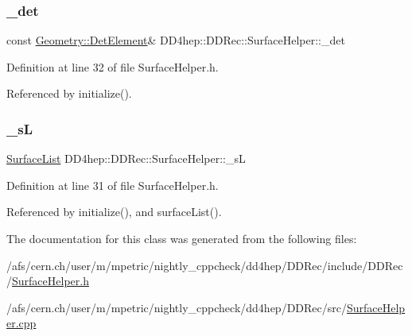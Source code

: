 \subsubsection{\texorpdfstring{\+\_\+det}{\_det}}
{\footnotesize\ttfamily const \hyperlink{class_d_d4hep_1_1_geometry_1_1_det_element}{Geometry\+::\+Det\+Element}\& D\+D4hep\+::\+D\+D\+Rec\+::\+Surface\+Helper\+::\+\_\+det\hspace{0.3cm}{\ttfamily [protected]}}



Definition at line 32 of file Surface\+Helper.\+h.



Referenced by initialize().

\hypertarget{class_d_d4hep_1_1_d_d_rec_1_1_surface_helper_a9284825af9dcbb9557f0cde59090dcd6}{}\label{class_d_d4hep_1_1_d_d_rec_1_1_surface_helper_a9284825af9dcbb9557f0cde59090dcd6} 
\subsubsection{\texorpdfstring{\+\_\+sL}{\_sL}}
{\footnotesize\ttfamily \hyperlink{class_d_d4hep_1_1_d_d_rec_1_1_surface_list}{Surface\+List} D\+D4hep\+::\+D\+D\+Rec\+::\+Surface\+Helper\+::\+\_\+sL\hspace{0.3cm}{\ttfamily [protected]}}



Definition at line 31 of file Surface\+Helper.\+h.



Referenced by initialize(), and surface\+List().



The documentation for this class was generated from the following files\+:\begin{DoxyCompactItemize}
\item 
/afs/cern.\+ch/user/m/mpetric/nightly\+\_\+cppcheck/dd4hep/\+D\+D\+Rec/include/\+D\+D\+Rec/\hyperlink{_surface_helper_8h}{Surface\+Helper.\+h}\item 
/afs/cern.\+ch/user/m/mpetric/nightly\+\_\+cppcheck/dd4hep/\+D\+D\+Rec/src/\hyperlink{_surface_helper_8cpp}{Surface\+Helper.\+cpp}\end{DoxyCompactItemize}
